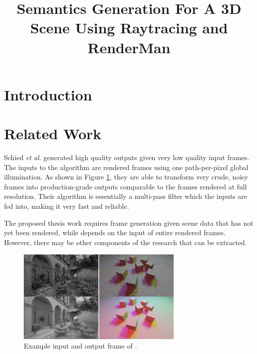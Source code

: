 \documentclass[conference]{IEEEtran}
\begin{document}
\title{Semantics Generation For A 3D Scene Using Raytracing and RenderMan}

\author{
}

\maketitle

\begin{abstract}
\end{abstract}

\section{Introduction}
\label{sec:introduction}


\section{Related Work}
\label{sec:related_work}
Schied \textit{et al.} \cite{spatiotemporal}
generated high quality outputs given very low quality input
frames. The inputs to the algorithm are rendered frames using one path-per-pixel global
illumination. As shown in Figure \ref{fig:spatiotemporal}, they are able to
transform very crude, noisy frames into production-grade outputs comparable to
the frames rendered at full resolution. Their algorithm is essentially a
multi-pass filter which the inputs are fed into, making it very fast and
reliable.

The proposed thesis work requires frame generation given scene data that has not yet been rendered,
while \cite{spatiotemporal} depends on the input of entire rendered frames.
However, there may be other components of the research that can be extracted.

\begin{figure}[htbp]
\centerline{\includegraphics[width=8cm]{spatiotemporal.png}}
\caption{Example input and output frame of \cite{spatiotemporal}.}
\label{fig:spatiotemporal}
\end{figure}
\end{document}
